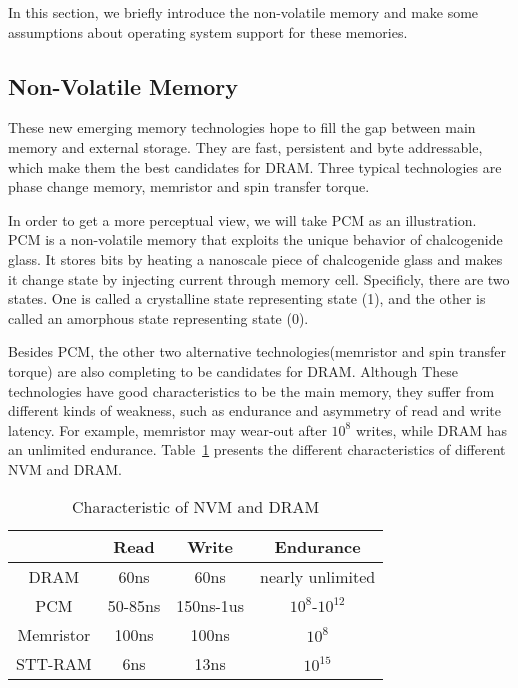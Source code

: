 \documentclass[10pt, conference, compsocconf]{IEEEtran}
\begin{document}
In this section, we briefly introduce the non-volatile memory and
make some assumptions about operating system support for these memories.

\subsection{Non-Volatile Memory}

These new emerging memory technologies hope to fill the gap between main memory and external storage.
They are fast, persistent and byte addressable, which make them the best candidates for DRAM.
Three typical technologies are phase change memory, memristor and spin transfer torque.

In order to get a more perceptual view, we will take PCM as an illustration. 
PCM is a non-volatile memory that exploits the unique behavior of chalcogenide glass.
It stores bits by heating a nanoscale piece of chalcogenide glass and makes it change state by injecting current through memory cell.
Specificly, there are two states.
One is called a crystalline state representing state (1), and the other is called an amorphous state representing state (0).

Besides PCM, the other two alternative technologies(memristor and spin transfer torque) are also completing to be candidates for DRAM.
Although These technologies have good characteristics to be the main memory,
they suffer from different kinds of weakness, such as endurance and asymmetry of read and write latency. 
For example, memristor may wear-out after $10^8$ writes, while DRAM has an unlimited endurance.
Table~\ref{tab:NVMvsDRAM} presents the different characteristics of different NVM and DRAM.

\begin{table}[h]
    \centering
    \caption{ {\upshape Characteristic of NVM and DRAM}}
    \begin{tabular}{|c|c|c|c|} \hline
        & Read & Write & Endurance\\ \hline
        DRAM & 60ns & 60ns & nearly unlimited\\ \hline
        PCM & 50-85ns & 150ns-1us & $10^8$-$10^{12}$\\ \hline
        Memristor & 100ns & 100ns & $10^8$\\ \hline
        STT-RAM & 6ns & 13ns & $10^{15}$\\ \hline
    \end{tabular}
\label{tab:NVMvsDRAM}
\end{table}
\end{document}

